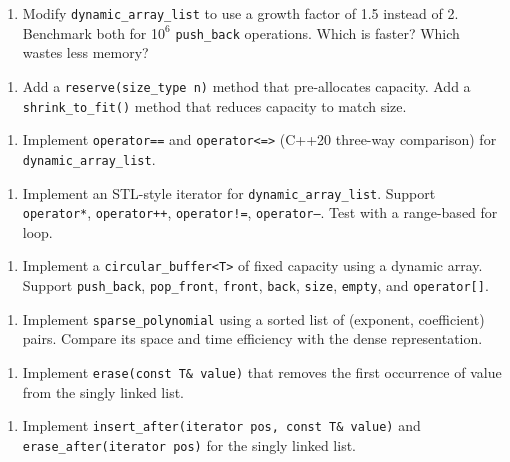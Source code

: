 \begin{enumerate}
\item Modify \texttt{dynamic\_array\_list} to use a growth factor of 1.5 instead of 2. Benchmark both for 1$0^{6}$ \texttt{push\_back} operations. Which is faster? Which wastes less memory?
\end{enumerate}

\begin{enumerate}
\item Add a \texttt{reserve(size\_type n)} method that pre-allocates capacity. Add a \texttt{shrink\_to\_fit()} method that reduces capacity to match size.
\end{enumerate}

\begin{enumerate}
\item Implement \texttt{operator==} and \texttt{operator<=>} (C++20 three-way comparison) for \texttt{dynamic\_array\_list}.
\end{enumerate}

\begin{enumerate}
\item Implement an STL-style iterator for \texttt{dynamic\_array\_list}. Support \texttt{operator*}, \texttt{operator++}, \texttt{operator!=}, \texttt{operator--}. Test with a range-based for loop.
\end{enumerate}

\begin{enumerate}
\item Implement a \texttt{circular\_buffer<T>} of fixed capacity using a dynamic array. Support \texttt{push\_back}, \texttt{pop\_front}, \texttt{front}, \texttt{back}, \texttt{size}, \texttt{empty}, and \texttt{operator[]}.
\end{enumerate}

\begin{enumerate}
\item Implement \texttt{sparse\_polynomial} using a sorted list of (exponent, coefficient) pairs. Compare its space and time efficiency with the dense representation.
\end{enumerate}

\begin{enumerate}
\item Implement \texttt{erase(const T\& value)} that removes the first occurrence of value from the singly linked list.
\end{enumerate}

\begin{enumerate}
\item Implement \texttt{insert\_after(iterator pos, const T\& value)} and \texttt{erase\_after(iterator pos)} for the singly linked list.
\end{enumerate}

